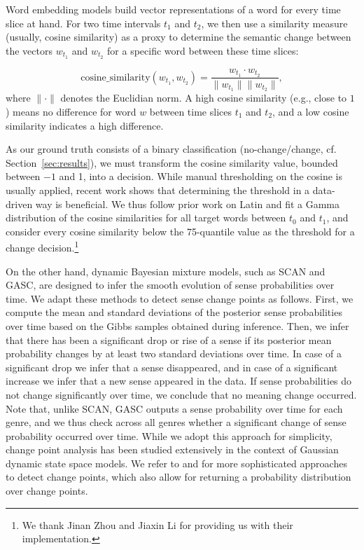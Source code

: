 \documentclass[output=paper%
]{langscibook}
\begin{document}
Word embedding models build vector representations of a word for every time slice at hand. For two time intervals $t_1$ and $t_2$, we then use a similarity measure (usually, cosine similarity) as a proxy to determine the semantic change between the vectors $w_{t_1}$ and $w_{t_2}$ for a specific word between these time slices:

\[\text{cosine\_similarity}(w_{t_1}, w_{t_2}) =
\frac{w_{t_1} \cdot w_{t_2}}{\|  w_{t_1} \| \| w_{t_2} \|},\] 
where $\|  \cdot \|$ denotes the Euclidian norm. A high cosine similarity (e.g., close to $1$) means no difference for word $w$ between time slices $t_1$ and $t_2$, and a low cosine similarity indicates a high difference.

As our ground truth consists of a binary classification (no-change\slash change, cf. Section~\ref{sec:results}), we must transform the cosine similarity value, bounded between $-1$ and 1, into a decision. 
While manual thresholding on the cosine is usually applied, recent work \citep{zhou-etal-2020-temporalteller} shows that determining the threshold in a data-driven way is beneficial. We thus follow prior work on Latin and fit a Gamma distribution of the cosine similarities for all target words between $t_0$ and $t_1$, and consider every cosine similarity below the 75-quantile value as the threshold for a change decision.\footnote{We thank Jinan Zhou and Jiaxin Li for providing us with their implementation.}

On the other hand, dynamic Bayesian mixture models, such as SCAN and GASC, are designed to infer the smooth evolution of sense probabilities over time. We adapt these methods to detect sense change points as follows. First, we compute the mean and standard deviations of the posterior sense probabilities over time based on the Gibbs samples obtained during inference. Then, we infer that there has been a significant drop or rise of a sense if its posterior mean probability changes by at least two standard deviations over time. In case of a significant drop we infer that a sense disappeared, and in case of a significant increase we infer that a new sense appeared in the data. If sense probabilities do not change significantly over time, we conclude that no meaning change occurred. Note that, unlike SCAN, GASC outputs a sense probability over time for each genre, and we thus check across all genres whether a significant change of sense probability occurred over time. While we adopt this approach for simplicity, change point analysis has been studied extensively in the context of Gaussian dynamic state space models. We refer to \citet{west1997} and \citet{frue2006} for more sophisticated approaches to detect change points, which also allow for returning a probability distribution over change points.
\end{document}
